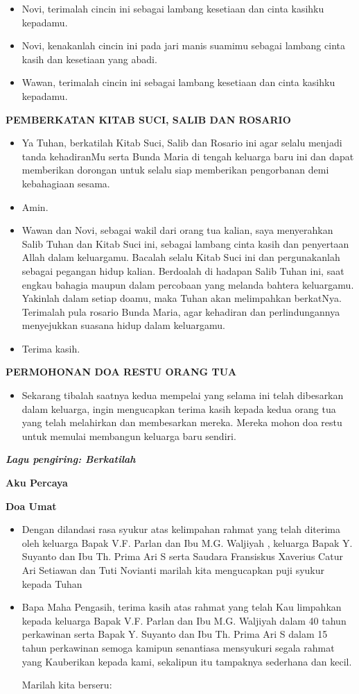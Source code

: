 \documentclass[10pt]{book}
\makeatletter
\newcommand{\subjudul}[1]{%
  {\parindent \z@ \normalfont
    \interlinepenalty\@M \bfseries #1\par\nobreak \vskip 20\p@ }}
\newcommand{\lagu}[1]{%
  {\parindent \z@ \normalfont
    \interlinepenalty\@M \bfseries \emph{#1}\par\nobreak \vskip 20\p@ }}
\newcommand{\BU}[1]{\begin{itemize} \item[U:] #1 \end{itemize}}
\newcommand{\BI}[1]{\begin{itemize} \item[I:] #1 \end{itemize}}
\newcommand{\BP}[1]{\begin{itemize} \item[P:] #1 \end{itemize}}
\newcommand{\BL}[1]{\begin{itemize} \item[Wawan:] #1 \end{itemize}}
\newcommand{\BW}[1]{\begin{itemize} \item[Novi:] #1 \end{itemize}}
\newcommand{\BMP}[1]{\begin{itemize} \item[W+N:] #1 \end{itemize}}
\newcommand{\ultah}{40 }
\newcommand{\suami}{V.F. Parlan }
\newcommand{\istri}{M.G. Waljiyah }
\newcommand{\ultahdua}{15 }
\newcommand{\suamidua}{Y. Suyanto }
\newcommand{\istridua}{Th. Prima Ari S }
\newcommand{\mempelaip}{Fransiskus Xaverius Catur Ari Setiawan }
\newcommand{\mempelaiw}{Tuti Novianti }
\makeatother
\begin{document}
\BL{Novi, terimalah cincin ini sebagai lambang kesetiaan dan cinta kasihku kepadamu.}  
		
\BI{Novi, kenakanlah cincin ini pada jari manis suamimu sebagai lambang cinta kasih dan kesetiaan yang abadi.} 

\BW{Wawan, terimalah cincin ini sebagai lambang kesetiaan dan cinta kasihku kepadamu.}  
		

\subjudul{PEMBERKATAN KITAB SUCI, SALIB DAN ROSARIO}

\BI{Ya Tuhan, berkatilah Kitab Suci, Salib dan Rosario ini agar selalu menjadi tanda kehadiranMu serta Bunda Maria di tengah keluarga baru ini dan dapat memberikan dorongan untuk selalu siap memberikan pengorbanan demi kebahagiaan sesama.}

\BU{Amin.}

\BI{Wawan dan Novi, sebagai wakil dari orang tua kalian, saya menyerahkan Salib Tuhan dan Kitab Suci ini, sebagai lambang cinta kasih dan penyertaan Allah dalam keluargamu. Bacalah selalu Kitab Suci ini dan pergunakanlah sebagai pegangan hidup kalian. Berdoalah di hadapan Salib Tuhan ini, saat engkau bahagia maupun dalam percobaan yang melanda bahtera keluargamu. Yakinlah dalam setiap doamu, maka Tuhan akan melimpahkan berkatNya. Terimalah pula rosario Bunda Maria, agar kehadiran dan perlindungannya menyejukkan suasana hidup dalam keluargamu.}

\BMP{Terima kasih.}


\subjudul{PERMOHONAN DOA RESTU ORANG TUA}

\BI{Sekarang tibalah saatnya kedua mempelai yang selama ini telah dibesarkan dalam keluarga, ingin mengucapkan terima kasih kepada kedua orang tua yang telah melahirkan dan membesarkan mereka. Mereka mohon doa restu untuk memulai membangun keluarga baru sendiri.}


\lagu{Lagu pengiring: Berkatilah}

\subjudul{Aku Percaya}

\subjudul{Doa Umat}

\BI{Dengan dilandasi rasa syukur atas kelimpahan rahmat yang telah diterima oleh keluarga Bapak \suami dan Ibu \istri, keluarga Bapak \suamidua dan Ibu \istridua serta Saudara \mempelaip dan \mempelaiw marilah kita mengucapkan puji syukur kepada Tuhan}

\BP{Bapa Maha Pengasih, terima kasih atas rahmat yang telah Kau limpahkan kepada keluarga Bapak \suami dan Ibu \istri 
dalam \ultah tahun perkawinan serta Bapak \suamidua dan Ibu \istridua dalam \ultahdua tahun perkawinan semoga kamipun senantiasa mensyukuri segala rahmat yang Kauberikan kepada kami, sekalipun itu tampaknya sederhana dan kecil.

Marilah kita berseru:}
\end{document}
